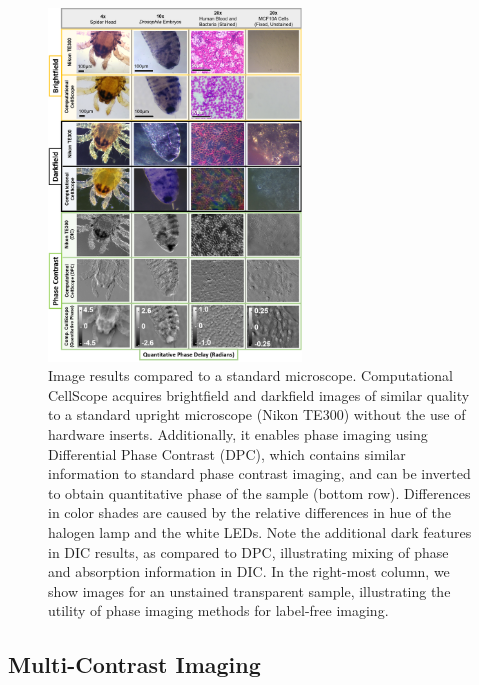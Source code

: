 \begin{figure}
\begin{center}
\includegraphics[width=0.6\textwidth]{figures/fig_ccs_mosaic.png}
\end{center}
\caption {{Image results compared to a standard microscope.} Computational CellScope acquires brightfield and darkfield images of similar quality to a standard upright microscope (Nikon TE300) without the use of hardware inserts. Additionally, it enables phase imaging using Differential Phase Contrast (DPC), which contains similar information to standard phase contrast imaging, and can be inverted to obtain quantitative phase of the sample (bottom row). Differences in color shades are caused by the relative differences in hue of the halogen lamp and the white LEDs. Note the additional dark features in DIC results, as compared to DPC, illustrating mixing of phase and absorption information in DIC. In the right-most column, we show images for an unstained transparent sample, illustrating the utility of phase imaging methods for label-free imaging.
}
\label{fig:fabrication:contrastcomparison}
\end{figure}

\subsection{Multi-Contrast Imaging}

